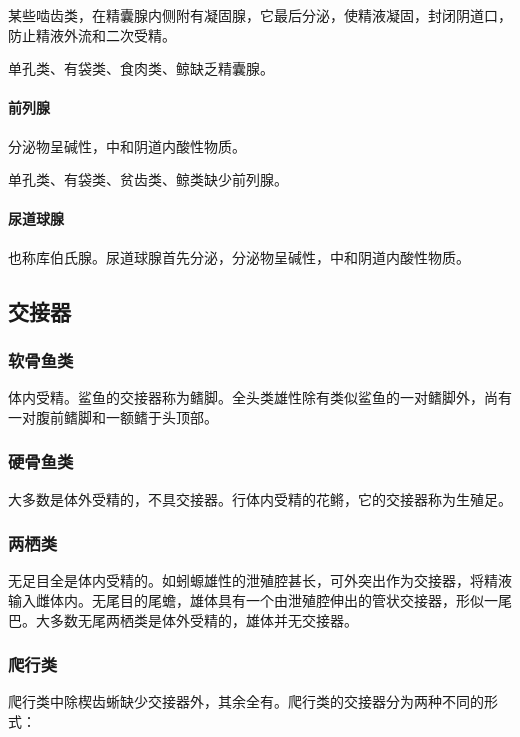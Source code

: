 某些啮齿类，在精囊腺内侧附有凝固腺，它最后分泌，使精液凝固，封闭阴道口，防止精液外流和二次受精。

单孔类、有袋类、食肉类、鲸缺乏精囊腺。

\paragraph{前列腺}

分泌物呈碱性，中和阴道内酸性物质。

单孔类、有袋类、贫齿类、鲸类缺少前列腺。

\paragraph{尿道球腺}

也称库伯氏腺。尿道球腺首先分泌，分泌物呈碱性，中和阴道内酸性物质。

\subsection{交接器}

\subsubsection{软骨鱼类}

体内受精。鲨鱼的交接器称为鳍脚。全头类雄性除有类似鲨鱼的一对鳍脚外，尚有一对腹前鳍脚和一额鳍于头顶部。

\subsubsection{硬骨鱼类}

大多数是体外受精的，不具交接器。行体内受精的花鳉，它的交接器称为生殖足。

\subsubsection{两栖类}

无足目全是体内受精的。如蚓螈雄性的泄殖腔甚长，可外突出作为交接器，将精液输入雌体内。无尾目的尾蟾，雄体具有一个由泄殖腔伸出的管状交接器，形似一尾巴。大多数无尾两栖类是体外受精的，雄体并无交接器。

\subsubsection{爬行类}

爬行类中除楔齿蜥缺少交接器外，其余全有。爬行类的交接器分为两种不同的形式：

